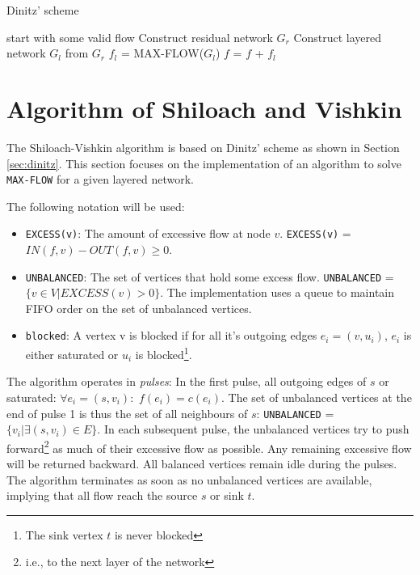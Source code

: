 \documentclass[a4paper,10pt, twocolumn]{article}
\begin{document}
\begin{algorithm}
\caption{Dinitz' scheme}
\label{algo:dinitz}
\begin{algorithmic}[1]
	\State start with some valid flow 
	 \Comment{\textcolor{OliveGreen}{$O(n)$}}	
		\State Construct residual network $G_r$ \Comment{\textcolor{OliveGreen}{$O(n)$, $p=O(n)$}}
		\State Construct layered network $G_l$ from $G_r$ 
		\State $f_l$ = MAX-FLOW($G_l$)  
		\State $f$ = $f$ + $f_l$ \Comment{\textcolor{OliveGreen}{$O(n)$}}
	\EndWhile
	\EndFunction
\end{algorithmic}
\end{algorithm}

\section{Algorithm of Shiloach and Vishkin}
\label{sec:shiloach}
The Shiloach-Vishkin algorithm is based on Dinitz' scheme as shown in Section \ref{sec:dinitz}. This section focuses on the implementation of an algorithm to solve \lstinline|MAX-FLOW| for a given layered network.

The following notation will be used:
\begin{itemize}
	\item \lstinline|EXCESS(v)|: The amount of excessive flow at node $v$. \lstinline|EXCESS(v)| = $IN(f,v) - OUT(f,v) \geq 0$.
	\item \lstinline|UNBALANCED|: The set of vertices that hold some excess flow. \lstinline|UNBALANCED| = $\{v \in V \lvert EXCESS(v) > 0 \}$. The implementation uses a queue to maintain FIFO order on the set of unbalanced vertices.
	\item \lstinline|blocked|: A vertex v is blocked if for all it's outgoing edges $e_i = (v, u_i)$, $e_i$ is either saturated or $u_i$ is blocked\footnote{The sink vertex $t$ is never blocked}. 
\end{itemize}

The algorithm operates in \emph{pulses}: In the first pulse, all outgoing edges of $s$ or saturated: $\forall e_i = (s, v_i):$ $f(e_i) = c(e_i)$. The set of unbalanced vertices at the end of pulse 1 is thus the set of all neighbours of $s$: \lstinline|UNBALANCED| = $\{v_i\lvert \exists (s, v_i) \in E \}$. In each subsequent pulse, the unbalanced vertices try to push forward\footnote{i.e., to the next layer of the network} as much of their excessive flow as possible. Any remaining excessive flow will be returned backward. All balanced vertices remain idle during the pulses. The algorithm terminates as soon as no unbalanced vertices are available, implying that all flow reach the source $s$ or sink $t$.
\end{document}
